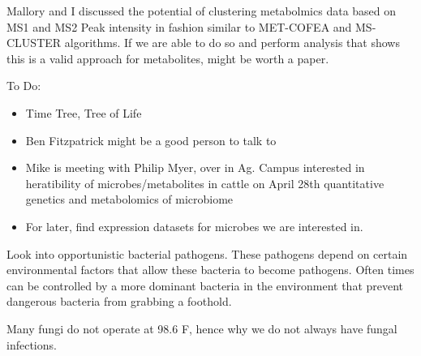 \documentclass[11pt]{labbook}
\begin{document}

Mallory and I discussed the potential of clustering metabolmics data based on MS1 and MS2 Peak intensity in fashion similar to MET-COFEA and MS-CLUSTER algorithms. If we are able to do so and perform analysis that shows this is a valid approach for metabolites, might be worth a paper. 





To Do:
\begin{itemize}
\item Time Tree, Tree of Life 
\item Ben Fitzpatrick might be a good person to talk to
\item Mike is meeting with Philip Myer, over in Ag. Campus interested in heratibility of microbes/metabolites in cattle on April 28th quantitative genetics and metabolomics of microbiome
\item For later, find expression datasets for microbes we are interested in.

\end{itemize}


Look into opportunistic bacterial pathogens. These pathogens depend on certain environmental factors that allow these bacteria to become pathogens. Often times can be controlled by a more dominant bacteria in the environment that prevent dangerous bacteria from grabbing a foothold.

Many fungi do not operate at 98.6 F, hence why we do not always have fungal infections.  

\end{document}
